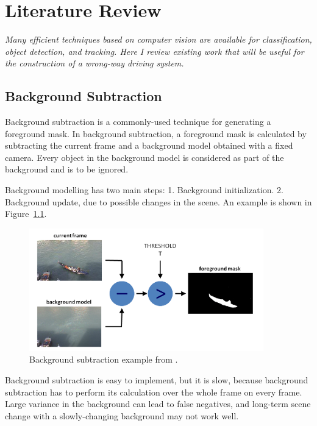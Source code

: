 \setlength{\footskip}{8mm}

\chapter{Literature Review} 
\label{ch:literature-review}

\textit{Many efficient techniques based on computer vision are available for classification, object detection, and tracking. Here I review existing work that will be useful for the construction of a wrong-way driving system.}

\section{Background Subtraction }
\label{Background Subtraction}
Background subtraction is a commonly-used technique for generating a foreground mask. In background subtraction, a foreground mask is calculated by subtracting the current frame and a background model obtained with a fixed camera. Every object in the background model is considered as part of the background and is to be ignored.

Background modelling has two main steps:\newline
\tab \hspace{8mm}1. Background initialization.\newline
\tab \hspace{8mm}2. Background update, due to possible changes in the scene.\newline
An example is shown in Figure~\ref{fig:background}.

\begin{figure}[t]
  \centering
  \includegraphics[width=4in]{figures/background.jpg}  
  \caption[background subtraction]{Background subtraction example from .}
  \label{fig:background}
\end{figure}

Background subtraction is easy to implement, but it is slow, because background subtraction has to perform its calculation over the whole frame on every frame. Large variance in the background can lead to false negatives, and long-term scene change with a slowly-changing background may not work well.


